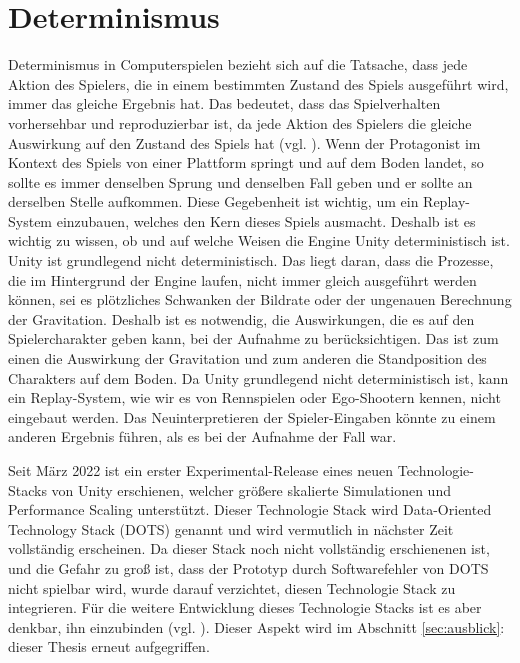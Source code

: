 \section{Determinismus}
Determinismus in Computerspielen bezieht sich auf die Tatsache, dass jede Aktion des Spielers, die in einem bestimmten Zustand des Spiels ausgeführt wird, immer das gleiche Ergebnis hat. Das bedeutet, dass das Spielverhalten vorhersehbar und reproduzierbar ist, da jede Aktion des Spielers die gleiche Auswirkung auf den Zustand des Spiels hat (vgl. \cite{noauthor_game_nodate}). Wenn der Protagonist im Kontext des Spiels von einer Plattform springt und auf dem Boden landet, so sollte es immer denselben Sprung und denselben Fall geben und er sollte an derselben Stelle aufkommen.
Diese Gegebenheit ist wichtig, um ein Replay-System einzubauen, welches den Kern dieses Spiels ausmacht. Deshalb ist es wichtig zu wissen, ob und auf welche Weisen die Engine Unity deterministisch ist. 
Unity ist grundlegend nicht deterministisch. Das liegt daran, dass die Prozesse, die im Hintergrund der Engine laufen, nicht immer gleich ausgeführt werden können, sei es plötzliches Schwanken der Bildrate oder der ungenauen Berechnung der Gravitation. Deshalb ist es notwendig, die Auswirkungen, die es auf den Spielercharakter geben kann, bei der Aufnahme zu berücksichtigen. Das ist zum einen die Auswirkung der Gravitation und zum anderen die Standposition des Charakters auf dem Boden. 
Da Unity grundlegend nicht deterministisch ist, kann ein Replay-System, wie wir es von Rennspielen oder Ego-Shootern kennen, nicht eingebaut werden. Das Neuinterpretieren der Spieler-Eingaben könnte zu einem anderen Ergebnis führen, als es bei der Aufnahme der Fall war.

Seit März 2022 ist ein erster Experimental-Release eines neuen Technologie-Stacks von Unity erschienen, welcher größere skalierte Simulationen und Performance Scaling unterstützt. Dieser Technologie Stack wird Data-Oriented Technology Stack (DOTS) genannt und wird vermutlich in nächster Zeit vollständig erscheinen. Da dieser Stack noch nicht vollständig erschienenen ist, und die Gefahr zu groß ist, dass der Prototyp durch Softwarefehler von DOTS nicht spielbar wird, wurde darauf verzichtet, diesen Technologie Stack zu integrieren. Für die weitere Entwicklung dieses Technologie Stacks ist es aber denkbar, ihn einzubinden  (vgl. \cite{technologies_dots_nodate}). Dieser Aspekt wird im Abschnitt \ref{sec:ausblick}:  dieser Thesis erneut aufgegriffen.
